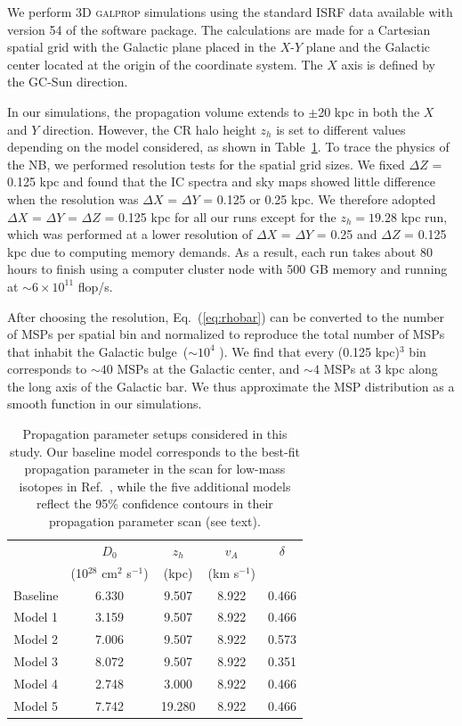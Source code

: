 \documentclass[doublespace,nopageskip]{VTthesis} %
\begin{document}
We perform 3D \textsc{galprop} simulations using the standard ISRF data available with version 54 of the software package. The calculations are made for a Cartesian spatial grid with the Galactic plane placed in the $X$-$Y$ plane and the Galactic center located at the origin of the coordinate system. The $X$ axis is defined by the GC-Sun direction.

In our simulations, the propagation volume extends to $\pm$20 kpc in both the $X$ and $Y$ direction. However, the CR halo height $z_h$ is set to different values depending on the model considered, as shown in Table~\ref{tab:dpara}. To trace the physics of the NB, we performed resolution tests for the spatial grid sizes. We fixed $\Delta Z$ = 0.125 kpc and found that the IC spectra and sky maps showed little difference when the resolution was $\Delta X$ = $\Delta Y$ = 0.125 or 0.25 kpc. We therefore adopted $\Delta X$ = $\Delta Y$ = $\Delta Z$ = 0.125 kpc for all our runs except for the $z_h = 19.28$ kpc run, which was performed at a lower resolution of $\Delta X$ = $\Delta Y$ = 0.25 and $\Delta Z$ = 0.125 kpc due to computing memory demands. As a result, each run takes about 80 hours to finish using a computer cluster node with 500 GB memory and running at $\sim 6 \times 10^{11}$ flop/s.

After choosing the resolution, Eq.~(\ref{eq:rhobar}) can be converted to the number of MSPs per spatial bin and normalized to reproduce the total number of MSPs that inhabit the Galactic bulge~($\sim 10^4$ \cite{Gonthier:2018ymi}). We find that every (0.125 kpc)$^3$ bin corresponds to $\sim 40$ MSPs at the Galactic center, and $\sim 4$ MSPs at 3 kpc along the long axis of the Galactic bar. We thus approximate the MSP distribution as a smooth function in our simulations.

\begin{table}[htb]
  \centering
  \caption{Propagation parameter setups considered in this study. Our baseline model corresponds to the best-fit propagation parameter in the scan for low-mass isotopes in Ref.~\cite{Johannesson:2016rlh}, while the five additional models reflect the 95\% confidence contours in their propagation parameter scan \cite{Johannesson:2016rlh} (see text).}
    \begin{tabular}{ c c c c c }
    \toprule
      & $D_0$ & $z_h$ & $v_A$  &$\delta$ \\
      & (10$^{28}$ cm$^2$ s$^{-1}$) & (kpc) & (km s$^{-1}$) & \\ 
      \midrule
      Baseline & 6.330 & 9.507 & 8.922 & 0.466 \\
      Model 1 & 3.159 & 9.507 & 8.922 & 0.466 \\
      Model 2 & 7.006 & 9.507 & 8.922 & 0.573 \\
      Model 3 & 8.072 & 9.507 & 8.922 & 0.351 \\
      Model 4 & 2.748 & 3.000 & 8.922 & 0.466 \\
      Model 5 & 7.742 & 19.280 & 8.922 & 0.466 \\
      \bottomrule
    \end{tabular}
\label{tab:dpara}
\end{table}
\end{document}
